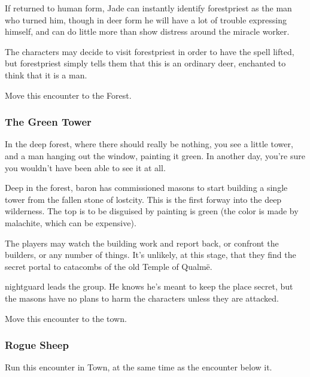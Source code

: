 
If returned to human form, Jade can instantly identify \gls{forestpriest} as the man who turned him, though in deer form he will have a lot of trouble expressing himself, and can do little more than show distress around the miracle worker.

The characters may decide to visit \gls{forestpriest} in order to have the spell lifted, but \gls{forestpriest} simply tells them that this is an ordinary deer, enchanted to think that it is a man.

Move this encounter to the Forest.

\subsubsection{The Green Tower}

\begin{boxtext}

	In the deep forest, where there should really be nothing, you see a little tower, and a man hanging out the window, painting it green.  In another day, you're sure you wouldn't have been able to see it at all.

\end{boxtext}

Deep in the forest, \gls{baron} has commissioned masons to start building a single tower from the fallen stone of \gls{lostcity}. This is the first forway into the deep wilderness.  The top is to be disguised by painting is green (the color is made by malachite, which can be expensive).

The players may watch the building work and report back, or confront the builders, or any number of things.  It's unlikely, at this stage, that they find the secret portal to catacombs of the old Temple of Qualm\"{e}.

\gls{nightguard} leads the group.  He knows he's meant to keep the place secret, but the masons have no plans to harm the characters unless they are attacked.

Move this encounter to the town.

\subsubsection{Rogue Sheep}

Run this encounter in Town, at the same time as the encounter below it.

